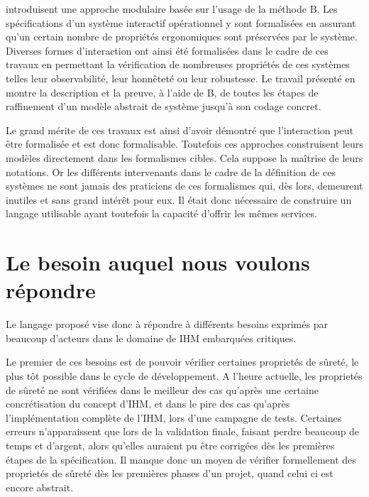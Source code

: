\documentclass{ihm}
\begin{document}
\cite{yamine98a,yamine98b} introduisent  une approche  modulaire basée
sur  l'usage  de  la  méthode  B.   Les  spécifications  d'un  système
interactif opérationnel  y sont formalisées en  assurant qu'un certain
nombre   de   propriétés   ergonomiques   sont   préservées   par   le
système. Diverses formes d'interaction  ont ainsi été formalisées dans
le cadre  de ces travaux  en permettant la vérification  de nombreuses
propriétés de  ces systèmes telles leur  observabilité, leur honnêteté
ou leur robustesse.  Le travail  présenté en \cite{yamine00} montre la
description  et la  preuve, à  l'aide de  B, de  toutes les  étapes de
raffinement  d'un  modèle  abstrait  de  système  jusqu'à  son  codage
concret.

Le  grand  mérite  de  ces  travaux est  ainsi  d'avoir  démontré  que
l'interaction peut être formalisée et est donc formalisable. Toutefois
ces  approches   construisent  leurs  modèles  directement   dans  les
formalismes cibles.  Cela  suppose la maîtrise de  leurs notations. Or
les  différents intervenants  dans le  cadre de  la définition  de ces
systèmes ne  sont jamais  des praticiens de  ces formalismes  qui, dès
lors, demeurent inutiles et sans grand intérêt pour eux. Il était donc
nécessaire  de construire  un  langage utilisable  ayant toutefois  la
capacité d'offrir les mêmes services.

\section{Le besoin auquel nous voulons répondre} 

Le langage proposé vise donc à répondre à différents besoins
exprimés par beaucoup d'acteurs dans le domaine de IHM
embarquées critiques.

Le premier de ces besoins est de pouvoir vérifier certaines
proprietés de sûreté, le plus tôt possible dans le cycle de
développement. A l'heure actuelle, les proprietés de sûreté ne
sont vérifiées dans le meilleur des cas qu'après une certaine
concrétisation du concept d'IHM, et dans le pire des cas
qu'après l'implémentation complète de l'IHM, lors d'une campagne
de tests. Certaines erreurs n'apparaissent que lors de la
validation finale, faisant perdre beaucoup de temps et d'argent,
alors qu'elles auraient pu être corrigées dès les premières
étapes de la spécification. Il manque donc un moyen de vérifier
formellement des proprietés de sûreté dès les premières phases
d'un projet, quand celui ci est encore abstrait.
\end{document}
